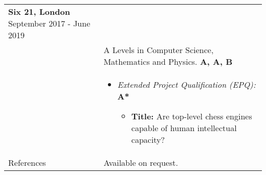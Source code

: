 \documentclass[12pt]{article}
\begin{document}
\begin{minipage}[t][0pt]{\linewidth}
\begin{tabular}[t]{p{2cm} p{14cm}}
		\textbf{Six 21, London} \hfill September 2017 - June 2019 \\ &
		A Levels in Computer Science, Mathematics and Physics. \hfill \textbf{A, A, B} \\ &
		
	    \begin{itemize}
    		\renewcommand{\labelitemi}{$\diamond$}
        	    \item \textit{Extended Project Qualification (EPQ):} \hfill \textbf{A*} 
        	    \begin{itemize}
    				\renewcommand{\labelitemii}{$\cdot$}
        			\item \textbf{Title:} Are top-level chess engines capable of human intellectual capacity?
			    \end{itemize}
		\end{itemize} \\

	{References} &
		Available on request.
\end{tabular}
\end{minipage}
\end{document}
